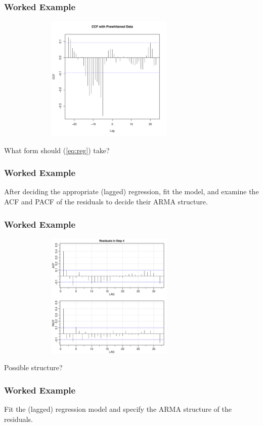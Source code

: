 \documentclass[%
xcolor=pdftex]{beamer}
\begin{document}
\begin{frame}
\frametitle{Worked Example}

\includegraphics[width=110mm, height=60mm]{ccf_soi.pdf}

What form should (\ref{eq:reg}) take?

\end{frame}

\begin{frame}
\frametitle{Worked Example}

After deciding the appropriate (lagged) regression, fit the model, and examine the ACF and PACF of the residuals to decide their ARMA structure.

\end{frame}

\begin{frame}
\frametitle{Worked Example}

\includegraphics[width=110mm, height=60mm]{residuals_soi.pdf}

Possible structure?

\end{frame}

\begin{frame}
\frametitle{Worked Example}

Fit the (lagged) regression model and specify the ARMA structure of the residuals.

\end{frame}
\end{document}
